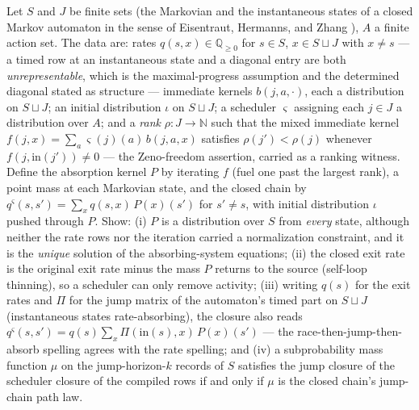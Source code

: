 \begin{problem}
\label{prob:mt-ma}
Let $S$ and $J$ be finite sets (the Markovian and the
instantaneous states of a closed Markov automaton in the sense of
Eisentraut, Hermanns, and Zhang \cite{eisentraut-hermanns-zhang-2010}),
$A$ a finite action set.  The data are: rates $q(s, x) \in
\mathbb{Q}_{\ge 0}$ for $s \in S$, $x \in S \sqcup J$ with $x \neq s$
--- a timed row at an instantaneous state and a diagonal entry are
both \emph{unrepresentable}, which is the maximal-progress assumption
and the determined diagonal stated as structure --- immediate kernels
$b(j, a, \cdot)$, each a distribution on $S \sqcup J$; an initial
distribution $\iota$ on $S \sqcup J$; a scheduler $\varsigma$
assigning each $j \in J$ a distribution over $A$; and a \emph{rank}
$\rho \colon J \to \mathbb{N}$ such that the mixed immediate kernel
$f(j, x) = \sum_a \varsigma(j)(a)\, b(j, a, x)$ satisfies
$\rho(j') < \rho(j)$ whenever $f(j, \mathrm{in}(j')) \neq 0$ --- the
Zeno-freedom assertion, carried as a ranking witness.  Define the
absorption kernel $P$ by iterating $f$ (fuel one past the largest
rank), a point mass at each Markovian state, and the closed chain by
$q^{\varsigma}(s, s') = \sum_{x} q(s, x)\, P(x)(s')$ for $s' \neq s$,
with initial distribution $\iota$ pushed through $P$.  Show: (i) $P$
is a distribution over $S$ from \emph{every} state, although neither
the rate rows nor the iteration carried a normalization constraint,
and it is the \emph{unique} solution of the absorbing-system
equations; (ii) the closed exit rate is the original exit rate minus
the mass $P$ returns to the source (self-loop thinning), so a
scheduler can only remove activity; (iii) writing $q(s)$ for the exit
rates and $\Pi$ for the jump matrix of the automaton's timed part on
$S \sqcup J$ (instantaneous states rate-absorbing), the closure also
reads $q^{\varsigma}(s, s') = q(s) \sum_x \Pi(\mathrm{in}(s), x)\,
P(x)(s')$ --- the race-then-jump-then-absorb spelling agrees with the
rate spelling; and (iv) a subprobability mass function $\mu$ on the
jump-horizon-$k$ records of $S$ satisfies the jump closure of the
scheduler closure of the compiled rows if and only if $\mu$ is the
closed chain's jump-chain path law.
\end{problem}


